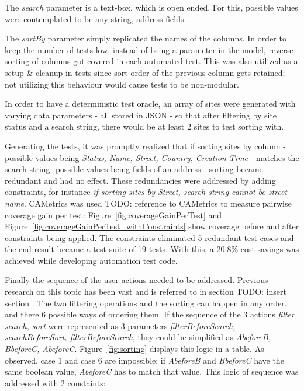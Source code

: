 \documentclass[conference]{IEEEtran}
\newcommand{\todo}[1]{}
\renewcommand{\todo}[1]{{\color{red} TODO: {#1}}}
\begin{document}
	The \textit{search} parameter is a text-box, which is open ended. For this, possible values were contemplated to be any string, address fields.

	The \textit{sortBy} parameter simply replicated the names of the columns. 
	In order to keep the number of tests low, instead of being a parameter in the model, reverse sorting of columns got covered in each automated test.
	This was also utilized as a setup \& cleanup in tests since sort order of the previous column gets retained; not utilizing this behaviour would cause tests to be non-modular.

	In order to have a deterministic test oracle, an array of sites were generated with varying data parameters - all stored in JSON - so that after filtering by site status and a search string, there would be at least 2 sites to test sorting with.
	
	Generating the tests, it was promptly realized that if sorting sites by column - possible values being \textit{Status, Name, Street, Country, Creation Time} - matches the search string -possible values being fields of an address - sorting became redundant and had no effect.
	These redundancies were addressed by adding constraints, for instance \textit{if sorting sites by Street, search string cannot be street name}. 
	CAMetrics was used \todo{reference to CAMetrics} to measure pairwise coverage gain per test: Figure~\ref{fig:coverageGainPerTest} and Figure~\ref{fig:coverageGainPerTest_withConstraints} show coverage before and after constraints being applied.
	The constraints eliminated 5 redundant test cases and the end result became a test suite of 19 tests. With this, a 20.8\% cost savings was achieved while developing automation test code.
	
	Finally the sequence of the user actions needed to be addressed. Previous research on this topic has been vast and is referred to in section \todo{insert section} .
	The two filtering operations and the sorting can happen in any order, and there 6 possible ways of ordering them.
	If the sequence of the 3 actions \textit{filter, search, sort} were represented as 3 parameters \textit{filterBeforeSearch, searchBeforeSort, filterBeforeSearch}, they could be simplified as \textit{AbeforeB, BbeforeC, AbeforeC}.
	Figure~\ref{fig:sorting} displays this logic in a table.
	As observed, case 1 and case 6 are impossible; if \textit{AbeforeB} and \textit{BbeforeC} have the same boolean value, \textit{AbeforeC} has to match that value.
	This logic of sequence was addressed with 2 constaints:
\end{document}
